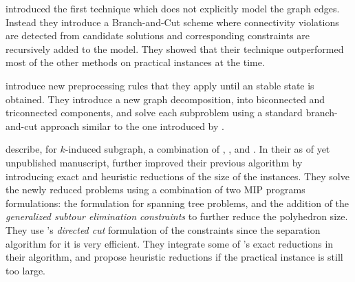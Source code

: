 		\Textcites{alvarez2013maximum}{alvarez2013rooted} introduced the first technique which does not explicitly model the graph edges.
		Instead they introduce a Branch-and-Cut scheme where connectivity violations are detected from candidate solutions and corresponding constraints are recursively added to the model.
		They showed that their technique outperformed most of the other methods on practical instances at the time.

		\Textcite{el2014solving} introduce new preprocessing rules that they apply until an stable state is obtained.
		They introduce a new graph decomposition, into biconnected and triconnected components, and solve each subproblem using a standard branch-and-cut approach similar to the one introduced by \textcite{alvarez2013maximum}.

		\Textcite{althaus2014algorithms} describe, for $k$-induced subgraph, a combination of \parencite{fischetti1994weighted}, \parencite{chimani2009obtaining}, and \parencite{cohen2010several}.
		In their as of yet unpublished manuscript, \textcite{althausalgorithms} further improved their previous algorithm by introducing exact and heuristic reductions of the size of the \mwcs{} instances.
		They solve the newly reduced problems using a combination of two MIP programs formulations: the \parencite{cohen2010several} formulation for spanning tree problems, and the addition of the \emph{generalized subtour elimination constraints} to further reduce the polyhedron size.
		They use \textcite{chimani2009obtaining}'s \emph{directed cut} formulation of the constraints since the separation algorithm for it is very efficient.
		They integrate some of \textcite{el2014solving}'s exact reductions in their algorithm, and propose heuristic reductions if the practical instance is still too large.

